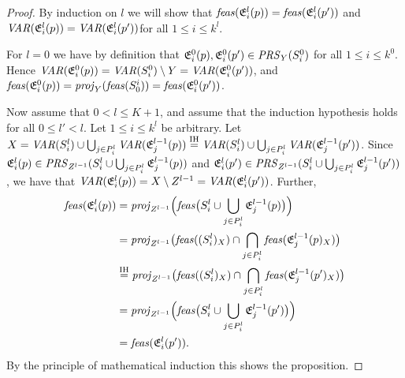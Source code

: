 \picking*
\begin{proof}
By induction on $l$ we will show that $\mathit{feas}(\mathfrak{E}^l_i(p))=\mathit{feas}(\mathfrak{E}^l_i(p'))$ and $\mathit{VAR}(\mathfrak{E}^l_i(p))=\mathit{VAR}(\mathfrak{E}^l_i(p'))$for all $1\leq i\leq k^l$.

For $l=0$ we have by definition that $\mathfrak{E}^0_i(p), \mathfrak{E}^0_i(p')\in\mathit{PRS}_Y(S^0_i)$ for all $1\leq i\leq k^0$. Hence $\mathit{VAR}(\mathfrak{E}^0_i(p)) = \mathit{VAR}(S^0_i)\setminus Y = \mathit{VAR}(\mathfrak{E}^0_i(p'))$, and $\mathit{feas}(\mathfrak{E}^0_i(p)) = \mathit{proj}_Y(\mathit{feas}(S^i_0)) = \mathit{feas}(\mathfrak{E}^0_i(p'))$.

Now assume that $0<l\leq K+1$, and assume that the induction hypothesis holds for all $0\leq l'<l$. Let $1\leq i\leq k^l$ be arbitrary. Let $X=\mathit{VAR}(S^l_i) \cup\bigcup_{j\in P^l_i} \mathit{VAR}(\mathfrak{E}^{l-1}_j(p)) \overset{\text{IH}}= \mathit{VAR}(S^l_i) \cup\bigcup_{j\in P^l_i} \mathit{VAR}(\mathfrak{E}^{l-1}_j(p'))$. 
Since
$\mathfrak{E}^l_i(p)\in \mathit{PRS}_{Z^{l-1}}(S^l_i \cup\bigcup_{j\in P^l_i} \mathfrak{E}^{l-1}_j(p))$ and
$\mathfrak{E}^l_i(p')\in \mathit{PRS}_{Z^{l-1}}(S^l_i \cup\bigcup_{j\in P^l_i} \mathfrak{E}^{l-1}_j(p'))$, 
we have that $\mathit{VAR}(\mathfrak{E}^l_i(p))=X\setminus Z^{l-1} = \mathit{VAR}(\mathfrak{E}^l_i(p'))$. 
Further,
\begin{align*}
\mathit{feas}(\mathfrak{E}^l_i(p))&= \mathit{proj}_{Z^{l-1}}\Big(\mathit{feas}\big(S^l_i\cup\bigcup_{j\in P^l_i} \mathfrak{E}^{l-1}_j(p)\big)\Big)\\
							&= \mathit{proj}_{Z^{l-1}}\big(\mathit{feas}((S^l_i)_X)\cap\bigcap_{j\in P^l_i}\mathit{feas}(\mathfrak{E}^{l-1}_j(p)_X)\big)\\
							&\overset{\text{IH}}= \mathit{proj}_{Z^{l-1}}\big(\mathit{feas}((S^l_i)_X)\cap\bigcap_{j\in P^l_i}\mathit{feas}(\mathfrak{E}^{l-1}_j(p')_X)\big)\\
							&= \mathit{proj}_{Z^{l-1}}\Big(\mathit{feas}\big(S^l_i\cup\bigcup_{j\in P^l_i} \mathfrak{E}^{l-1}_j(p')\big)\Big)\\
							&= \mathit{feas}(\mathfrak{E}^l_i(p')).
\end{align*}
By the principle of mathematical induction this shows the proposition.
\end{proof}

